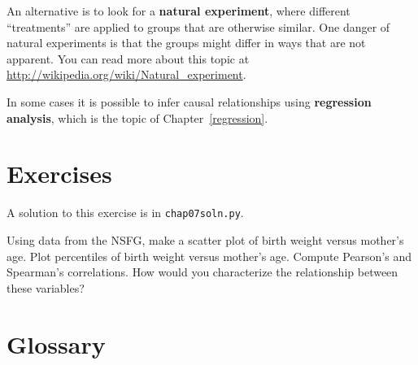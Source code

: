 An alternative is to look for a {\bf natural experiment}, where
different ``treatments'' are applied to groups that are otherwise
similar.  One danger of natural experiments is that the groups might
differ in ways that are not apparent.  You can read more about this
topic at \url{http://wikipedia.org/wiki/Natural_experiment}.

In some cases it is possible to infer causal relationships using {\bf
  regression analysis}, which is the topic of Chapter~\ref{regression}.


\section{Exercises}

A solution to this exercise is in \verb"chap07soln.py".

\begin{exercise}
Using data from the NSFG, make a scatter plot of birth weight
versus mother's age.  Plot percentiles of birth weight
versus mother's age.  Compute Pearson's and Spearman's correlations.
How would you characterize the relationship
between these variables?
\end{exercise}


\section{Glossary}

